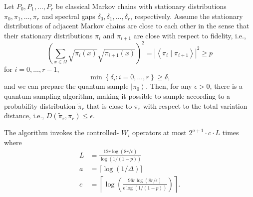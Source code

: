 \begin{theorem}
	Let $P_0, P_1, \ldots, P_r$ be classical Markov chains with stationary distributions $\pi_0, \pi_1, \ldots, \pi_r$ and spectral gaps $\delta_0, \delta_1, \ldots, \delta_r$, respectively. Assume the stationary distributions of adjacent Markov chains are close to each other in the sense that their stationary distributions $\pi_i$ and $\pi_{i+1}$ are close with respect to fidelity, i.e.,
	$$
	\left(\sum_{x \in \Omega} \sqrt{\pi_i(x)} \sqrt{\pi_{i+1}(x)}\right)^2=\left|\left\langle\pi_i \mid \pi_{i+1}\right\rangle\right|^2 \geq p
	$$
	for $i=0, \ldots, r-1$,
	$$
	\min \left\{\delta_i: i=0, \ldots, r\right\} \geq \delta,
	$$
	and we can prepare the quantum sample $\left|\pi_0\right\rangle$.
	Then, for any $\epsilon>0$, there is a quantum sampling algorithm, making it possible to sample according to a probability distribution $\tilde{\pi}_r$ that is close to $\pi_r$ with respect to the total variation distance, i.e., $D\left(\tilde{\pi}_r, \pi_r\right) \leq \epsilon$.
	
	The algorithm invokes the controlled- $W_i$ operators at most $2^{a+1} \cdot c \cdot L$ times where
	$$
	\begin{aligned}
		L & =\frac{12 r \log (8 r / \epsilon)}{\log (1 /(1-p))} \\
		a & =\lceil\log (1 / \Delta)\rceil \\
		c & =\left\lceil\log \left(\frac{96 r \log (8 r / \epsilon)}{\epsilon \log (1 /(1-p))}\right)\right\rceil .
	\end{aligned}
	$$
	
\end{theorem}\vspace{5mm}
